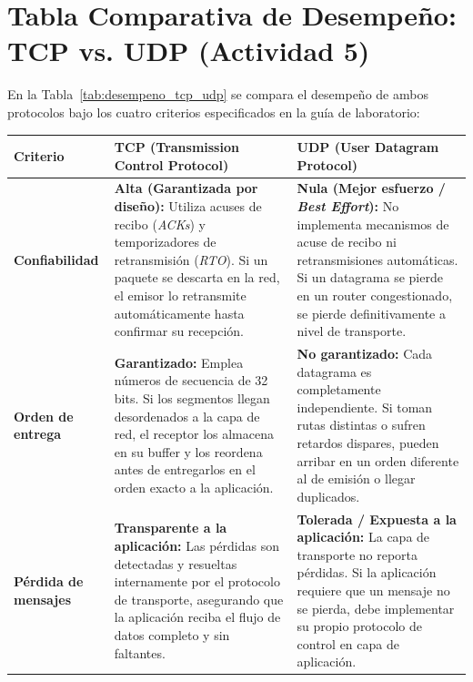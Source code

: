 \documentclass[11pt,a4paper]{article}
\begin{document}
\newpage
\section{Tabla Comparativa de Desempeño: TCP vs. UDP (Actividad 5)}

En la Tabla~\ref{tab:desempeno_tcp_udp} se compara el desempeño de ambos protocolos bajo los cuatro criterios especificados en la guía de laboratorio:

\begin{table}[H]
    \centering
    \begin{tabularx}{\textwidth}{|l|X|X|}
        \hline
        \textbf{Criterio} & \textbf{TCP (Transmission Control Protocol)} & \textbf{UDP (User Datagram Protocol)} \\ \hline
        \textbf{Confiabilidad} & 
        \textbf{Alta (Garantizada por diseño):} Utiliza acuses de recibo (\textit{ACKs}) y temporizadores de retransmisión (\textit{RTO}). Si un paquete se descarta en la red, el emisor lo retransmite automáticamente hasta confirmar su recepción. & 
        \textbf{Nula (Mejor esfuerzo / \textit{Best Effort}):} No implementa mecanismos de acuse de recibo ni retransmisiones automáticas. Si un datagrama se pierde en un router congestionado, se pierde definitivamente a nivel de transporte. \\ \hline
        \textbf{Orden de entrega} & 
        \textbf{Garantizado:} Emplea números de secuencia de 32 bits. Si los segmentos llegan desordenados a la capa de red, el receptor los almacena en su buffer y los reordena antes de entregarlos en el orden exacto a la aplicación. & 
        \textbf{No garantizado:} Cada datagrama es completamente independiente. Si toman rutas distintas o sufren retardos dispares, pueden arribar en un orden diferente al de emisión o llegar duplicados. \\ \hline
        \textbf{Pérdida de mensajes} & 
        \textbf{Transparente a la aplicación:} Las pérdidas son detectadas y resueltas internamente por el protocolo de transporte, asegurando que la aplicación reciba el flujo de datos completo y sin faltantes. & 
        \textbf{Tolerada / Expuesta a la aplicación:} La capa de transporte no reporta pérdidas. Si la aplicación requiere que un mensaje no se pierda, debe implementar su propio protocolo de control en capa de aplicación. \\ \hline

\end{tabularx}
\end{table}
\end{document}
